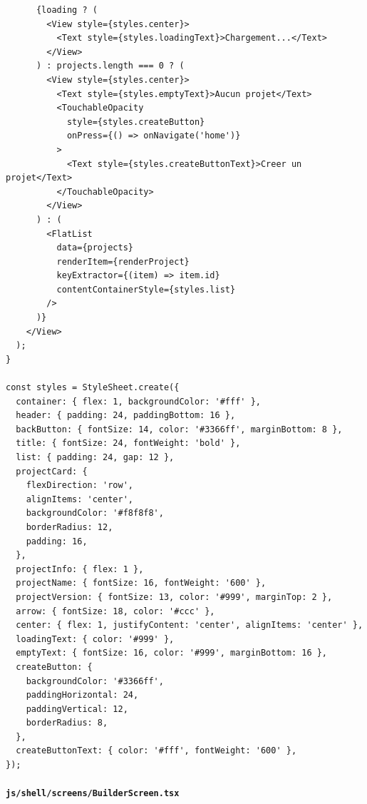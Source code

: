 \documentclass[11pt]{article}
\begin{document}
\begin{verbatim}
      {loading ? (
        <View style={styles.center}>
          <Text style={styles.loadingText}>Chargement...</Text>
        </View>
      ) : projects.length === 0 ? (
        <View style={styles.center}>
          <Text style={styles.emptyText}>Aucun projet</Text>
          <TouchableOpacity
            style={styles.createButton}
            onPress={() => onNavigate('home')}
          >
            <Text style={styles.createButtonText}>Creer un projet</Text>
          </TouchableOpacity>
        </View>
      ) : (
        <FlatList
          data={projects}
          renderItem={renderProject}
          keyExtractor={(item) => item.id}
          contentContainerStyle={styles.list}
        />
      )}
    </View>
  );
}

const styles = StyleSheet.create({
  container: { flex: 1, backgroundColor: '#fff' },
  header: { padding: 24, paddingBottom: 16 },
  backButton: { fontSize: 14, color: '#3366ff', marginBottom: 8 },
  title: { fontSize: 24, fontWeight: 'bold' },
  list: { padding: 24, gap: 12 },
  projectCard: {
    flexDirection: 'row',
    alignItems: 'center',
    backgroundColor: '#f8f8f8',
    borderRadius: 12,
    padding: 16,
  },
  projectInfo: { flex: 1 },
  projectName: { fontSize: 16, fontWeight: '600' },
  projectVersion: { fontSize: 13, color: '#999', marginTop: 2 },
  arrow: { fontSize: 18, color: '#ccc' },
  center: { flex: 1, justifyContent: 'center', alignItems: 'center' },
  loadingText: { color: '#999' },
  emptyText: { fontSize: 16, color: '#999', marginBottom: 16 },
  createButton: {
    backgroundColor: '#3366ff',
    paddingHorizontal: 24,
    paddingVertical: 12,
    borderRadius: 8,
  },
  createButtonText: { color: '#fff', fontWeight: '600' },
});
\end{verbatim}

\paragraph{\texttt{js/shell/screens/BuilderScreen.tsx}}
\end{document}
